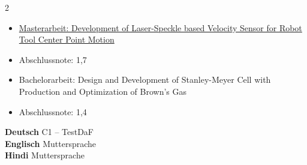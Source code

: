\documentclass[9pt,a4paper,withhyper]{altacv}
\begin{document}
\begin{paracol}{2}
%
%
%


\switchcolumn

  \begin{itemize}
    \item \href{https://drive.google.com/file/d/1J5xoOq-rh2UYf5aAfnolYBZ7_LzZLqmU/view}{Masterarbeit: Development of Laser-Speckle based Velocity Sensor for Robot Tool Center Point Motion}
    \item Abschlussnote: 1,7
  \end{itemize}

  \divider

  \begin{itemize}
      \item Bachelorarbeit: Design and Development of Stanley-Meyer Cell with Production and Optimization of Brown's Gas 
      \item Abschlussnote: 1,4
  \end{itemize}

\textbf{Deutsch} \hspace{1.02cm} C1 -- TestDaF \\
\textbf{Englisch} \hspace{1.05cm} Muttersprache \\
\textbf{Hindi} \hspace{1.45cm} Muttersprache


\end{paracol}
\end{document}
